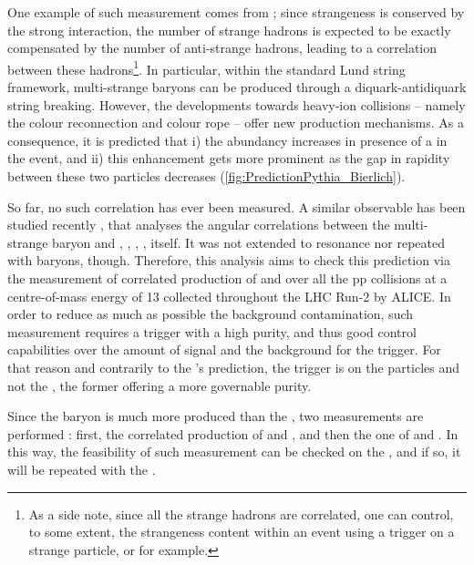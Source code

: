 One example of such measurement comes from \Pythia; since strangeness is conserved by the strong interaction, the number of strange hadrons is expected to be exactly compensated by the number of anti-strange hadrons, leading to a correlation between these hadrons\footnote{As a side note, since all the strange hadrons are correlated, one can control, to some extent, the strangeness content within an event using a trigger on a strange particle, \rmXi or \rmOmega for example.}. In particular, within the standard Lund string framework, multi-strange baryons can be produced through a diquark-antidiquark string breaking. However, the  developments towards heavy-ion collisions -- namely the colour reconnection and colour rope \cite{christiansenStringFormationLeading2015, bierlichEffectsOverlappingStrings2015a, adolfssonQCDChallengesPp2020} -- offer new production mechanisms. As a consequence, it is predicted that i) the \rmOmega abundancy increases in presence of a \rmPhiMes in the event, and ii) this enhancement gets more prominent as the gap in rapidity between these two particles decreases (\fig\ref{fig:PredictionPythia_Bierlich}).

So far, no such correlation has ever been measured. A similar observable has been studied recently \cite{adolfssonStudyXiHadron2020}, that analyses the angular correlations between the multi-strange baryon \rmXiPM and \pOrPbar, \rmPiPM, \rmKPM, \rmLambdaPM, \rmXiPM itself. It was not extended to \rmPhiMes resonance nor repeated with \rmOmega baryons, though. Therefore, this analysis aims to check this prediction via the measurement of correlated production of \rmOmega and \rmPhiMes over all the pp collisions at a centre-of-mass energy of 13 \tev collected throughout the LHC Run-2 by ALICE. In order to reduce as much as possible the background contamination, such measurement requires a trigger with a high purity, and thus good control capabilities over the amount of signal and the background for the trigger. For that reason and contrarily to the \Pythia's prediction, the trigger is on the \rmOmega particles and not the \rmPhiMes, the former offering a more governable purity.

Since the \rmXi baryon is much more produced than the \rmOmega, two measurements are performed : first, the correlated production of \rmXi and \rmPhiMes, and then the one of \rmOmega and \rmPhiMes. In this way, the feasibility of such measurement can be checked on the \rmXi, and if so, it will be repeated with the \rmOmega.\\

